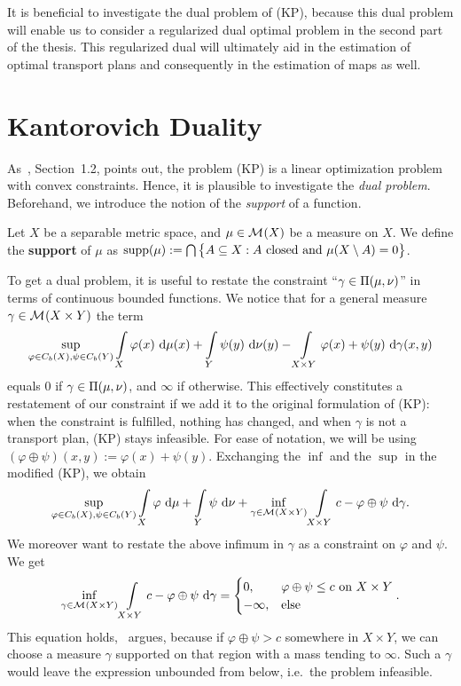 It is beneficial to investigate the dual problem of (KP), because this dual problem will enable us to consider a regularized dual optimal problem in the second part of the thesis. This regularized dual will ultimately aid in the estimation of optimal transport plans and consequently in the estimation of maps as well.

\section{Kantorovich Duality}\label{KanDual}

As~\cite{San2015}, Section~1.2, points out, the problem (KP) is a linear optimization problem with convex constraints. Hence, it is plausible to investigate the \textit{dual problem}. Beforehand, we introduce the notion of the \textit{support} of a function.

\begin{definition}\label{Supp}
	Let $X$ be a separable metric space, and $\mu \in \M{X}$ be a measure on $X$. We define the \textbf{support} of $\mu$ as $\supp{\mu} := \bigcap \big\{ A \subseteq X : A \text{ closed and } \mu(X \setminus A) = 0 \big\}$.
\end{definition}

To get a dual problem, it is useful to restate the constraint ``$\gamma \in \TP{\mu}{\nu}$'' in terms of continuous bounded functions. We notice that for a general measure $\gamma \in \M{X \times Y}$ the term
\[ \sup\limits_{\varphi \in \CF[b]{X}, \psi \in \CF[b]{Y}} \int\limits_X \varphi(x)~\Dx{\mu} + \int\limits_Y \psi(y)~\Dx[y]{\nu} - \int\limits_{X \times Y} \varphi(x) + \psi(y)~\Dx[x, y]{\gamma} \]
equals $0$ if $\gamma \in \TP{\mu}{\nu}$, and $\infty$ if otherwise. This effectively constitutes a restatement of our constraint if we add it to the original formulation of (KP): when the constraint is fulfilled, nothing has changed, and when $\gamma$ is not a transport plan, (KP) stays infeasible. For ease of notation, we will be using $(\varphi \oplus \psi)(x, y) := \varphi(x) + \psi(y)$. Exchanging the $\inf$ and the $\sup$ in the modified (KP), we obtain
\[ \sup\limits_{\varphi \in \CF[b]{X}, \psi \in \CF[b]{Y}} \int\limits_{X} \varphi~\D + \int\limits_{Y} \psi~\D[\nu] + \inf\limits_{\gamma \in \M{X \times Y}} \int\limits_{X \times Y} c - \varphi \oplus \psi~\D[\gamma]. \]
We moreover want to restate the above infimum in $\gamma$ as a constraint on $\varphi$ and $\psi$. We get
\[ \inf\limits_{\gamma \in \M{X \times Y}} \int\limits_{X \times Y} c - \varphi \oplus \psi~\D[\gamma] = 
\begin{cases}
	0, & \varphi \oplus \psi \le c \text{ on } X \times Y \\
	- \infty, & \text{else}
\end{cases}. \]
This equation holds,\ \cite{San2015} argues, because if $\varphi \oplus \psi > c$ somewhere in $X \times Y$, we can choose a measure $\gamma$ supported on that region with a mass tending to $\infty$. Such a $\gamma$ would leave the expression unbounded from below, i.e.\ the problem infeasible.


